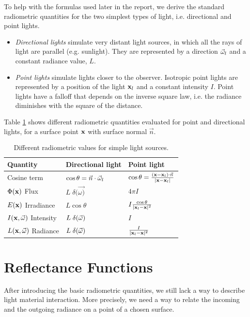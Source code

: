 To help with the formulas used later in the report, we derive the standard radiometric quantities for the two simplest types of light, i.e. directional and point lights.
\begin{itemize}
	\item \textit{Directional lights} simulate very distant light sources, in which all the rays of light are parallel (e.g. sunlight). They are represented by a direction $\vec{\omega}_l$ and a constant radiance value, $L$. 
	\item \textit{Point lights} simulate lights closer to the observer. Isotropic point lights are represented by a position of the light $\mathbf{x}_l$ and a constant intensity $I$. Point lights have a falloff that depends on the inverse square law, i.e. the radiance diminishes with the square of the distance.
\end{itemize}

Table \ref{table:radio} shows different radiometric quantities evaluated for point and directional lights, for a surface point $\mathbf{x}$ with surface normal $\vec{n}$. 

\renewcommand{\arraystretch}{1.8}
\begin{table}[!ht]
    \centering
    \begin{tabularx}{0.95\textwidth}{|X|X|X|}
    \hline
    Quantity   & Directional light & Point light \\ \hline
    Cosine term       & $\cos\theta = \vec{n} \cdot \vec{\omega}_l$ & $\cos\theta = \frac{(\mathbf{x} - \mathbf{x}_l) \cdot \vec{n}}{|\mathbf{x} - \mathbf{x}_l|}$     \\ \hline
    $\Phi(\mathbf{x})$ Flux       & $L\; \delta(\vec{\omega)}$                  & $4 \pi I$           \\ \hline
    $E(\mathbf{x})$ Irradiance & $L \cos\theta $                 & $I \frac{\cos\theta}{|\mathbf{x}_l - \mathbf{x}|^2}$          \\ \hline
    $I(\mathbf{x},\vec{\omega})$ Intensity  & $L\; \delta(\vec{\omega})$                 & $I$           \\ \hline
    $L(\mathbf{x},\vec{\omega})$ Radiance   & $L\; \delta(\vec{\omega})$               & $\frac{I}{|\mathbf{x}_l - \mathbf{x}|^2}$           \\ \hline
    \end{tabularx}
\caption{Different radiometric values for simple light sources.}
\label{table:radio}
\end{table}

\section{Reflectance Functions}
After introducing the basic radiometric quantities, we still lack a way to describe light material interaction. More precisely, we need a way to relate the incoming and the outgoing radiance on a point of a chosen surface. 

